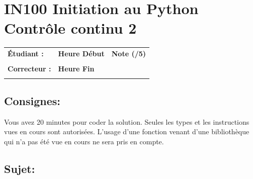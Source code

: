 \documentclass[a4paper,11pt]{article}
\begin{document}
\newtheorem{theo}{Theorem}
\newtheorem{coro}{Corollary}[theo]
\newtheorem{lemme}{Lemma}
\renewcommand{\thecoro}{\thetheo.\arabic{coro}}



\parindent=0cm


\section*{\center IN100 Initiation au Python\\
Contrôle continu 2}

\vspace{1 cm}

\begin{table}[h!]
\centering
\renewcommand{\arraystretch}{1.4} %
\begin{tabular}{|p{10cm}|p{3cm}|p{2cm}|}
\hline
\textbf{Étudiant :} & \textbf{Heure Début }  & \textbf{Note (/5) }  \\
& & \\
\hline
\textbf{Correcteur :} & \textbf{Heure Fin } & \\
& & \\
\hline

\hline
\end{tabular}
\end{table}


\subsection*{Consignes:} Vous avez 20 minutes pour coder la solution. Seules les types et les instructions vues en cours sont autorisées. L'usage d'une fonction 
venant d'une bibliothèque qui n'a pas été vue en cours ne sera pris en compte. 


\subsection*{Sujet:}
\end{document}
